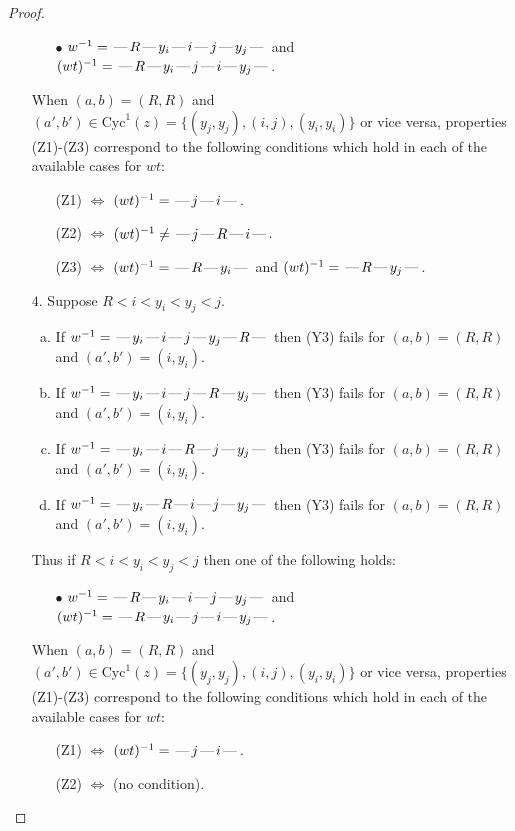 \documentclass[10pt]{article}
\theoremstyle{definition}
\theoremstyle{definition}
\def\dash{\text{\hspace{0.5mm}---\hspace{0.5mm}}}
\def\Cyc{\mathrm{Cyc}}
\begin{document}
\begin{proof}
\begin{enumerate}
\begin{enumerate}
\item[$\bullet$] $w^{-1} = \dash R\dash y_i\dash i\dash j\dash y_j\dash $ and $(wt)^{-1} = \dash R\dash y_i\dash j\dash i\dash y_j\dash $.
\end{enumerate}
When $(a,b)= (R,R)$ and $(a',b')\in \Cyc^1(z)=\{(y_j,y_j),(i,j),(y_i,y_i)\}$ or vice versa,
properties (Z1)-(Z3) correspond to the following conditions which
hold in each of the available cases for $wt$:
\begin{enumerate}
\item[](Z1) $\Leftrightarrow$ $(wt)^{-1} = \dash j \dash i \dash$.
\item[](Z2) $\Leftrightarrow$ $(wt)^{-1} \neq \dash j \dash R \dash i \dash$.
\item[](Z3) $\Leftrightarrow$ $(wt)^{-1} = \dash R \dash y_i \dash$  and $(wt)^{-1} = \dash R \dash y_j \dash$.
\end{enumerate}
\item[$4$.] Suppose $R < i < y_i < y_j < j$.
\begin{enumerate}[(a)]
\item If $w^{-1} = \dash y_i\dash i\dash j\dash y_j\dash R\dash $ then (Y3) fails for $(a,b)=(R,R)$ and $(a',b')=(i,y_i)$.
\item If $w^{-1} = \dash y_i\dash i\dash j\dash R\dash y_j\dash $ then (Y3) fails for $(a,b)=(R,R)$ and $(a',b')=(i,y_i)$.
\item If $w^{-1} = \dash y_i\dash i\dash R\dash j\dash y_j\dash $ then (Y3) fails for $(a,b)=(R,R)$ and $(a',b')=(i,y_i)$.
\item If $w^{-1} = \dash y_i\dash R\dash i\dash j\dash y_j\dash $ then (Y3) fails for $(a,b)=(R,R)$ and $(a',b')=(i,y_i)$.
\end{enumerate}
Thus if $R < i < y_i < y_j < j$ then one of the following holds:
\begin{enumerate}
\item[$\bullet$] $w^{-1} = \dash R\dash y_i\dash i\dash j\dash y_j\dash $ and $(wt)^{-1} = \dash R\dash y_i\dash j\dash i\dash y_j\dash $.
\end{enumerate}
When $(a,b)= (R,R)$ and $(a',b')\in \Cyc^1(z)=\{(y_j,y_j),(i,j),(y_i,y_i)\}$ or vice versa,
properties (Z1)-(Z3) correspond to the following conditions which
hold in each of the available cases for $wt$:
\begin{enumerate}
\item[](Z1) $\Leftrightarrow$ $(wt)^{-1} = \dash j \dash i \dash$.
\item[](Z2) $\Leftrightarrow$ (no condition).

\end{enumerate}
\end{enumerate}
\end{proof}
\end{document}
